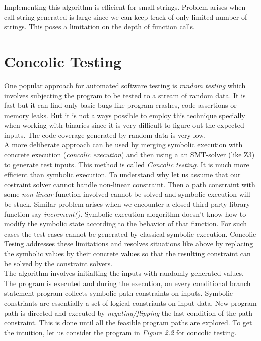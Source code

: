 \documentclass[12pt,oneside]{book}
\begin{document}
Implementing this algorithm is efficient for small strings. Problem arises when call string generated is large since we can keep track of only limited number of strings. This poses a limitation on the depth of function calls.



\section {Concolic Testing}

One popular approach for automated software testing is \textit{random testing} which involves subjecting the program to be tested to a stream of random data. It is fast but it can find only basic bugs like program crashes, code assertions or memory leaks. But it is not always possible to employ this technique specially when working with binaries since it is very difficult to figure out the expected inputs. The code coverage generated by random data is very low.\\

A more deliberate approach can be used by merging symbolic execution with concrete execution (\textit{concolic execution}) and then using a an SMT-solver (like Z3) to generate test inputs. This method is called \textit{Concolic testing}. It is much more efficient than symbolic execution. To understand why let us assume that our costraint solver cannot handle non-linear constraint. Then a path constraint with some \textit{non-linear} function involved cannot be solved and symbolic execution will be stuck. Similar problem arises when we encounter a closed third party library function say \textit{increment()}. Symbolic execution alogorithm doesn't know how to modify the symbolic state according to the behavior of that function. For such cases the test cases cannot be generated by classical symbolic execution. Concolic Tesing addresses these limitations and resolves situations like above by replacing the symbolic values by their concrete values so that the resulting constraint can be solved by the constraint solvers.\\

The algorithm involves initialting the inputs with randomly generated values. The program is executed and during the execution, on every conditional branch statement program collects symbolic path constraints on inputs. Symbolic constriants are essentially a set of logical constriants on input data. New program path is directed and executed by \textit{negating/flipping} the last condition of the path constraint. This is done until all the feasible program paths are explored. To get the intuition, let us consider the program in \textit{Figure 2.2} for concolic testing.  
\end{document}
